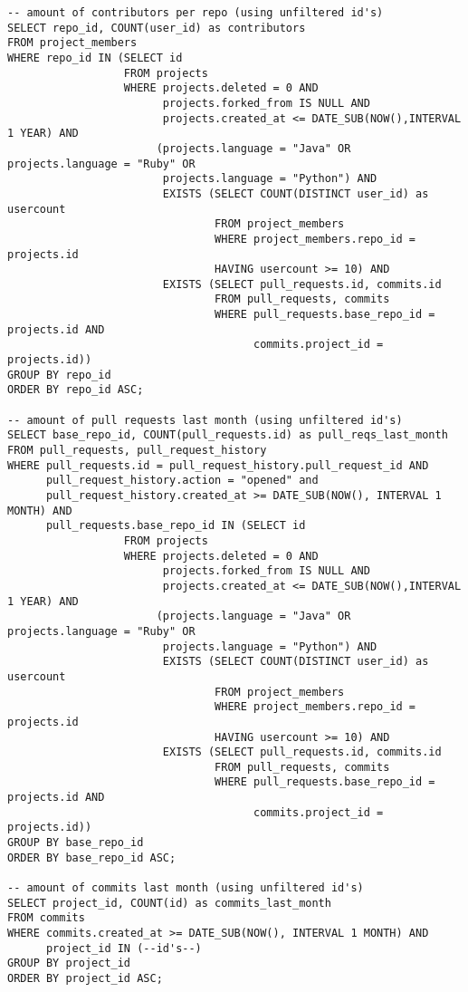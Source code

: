 \documentclass[a4paper,11pt]{article}
\begin{document}
	{\scriptsize
	\begin{verbatim}
-- amount of contributors per repo (using unfiltered id's)
SELECT repo_id, COUNT(user_id) as contributors 
FROM project_members 
WHERE repo_id IN (SELECT id  
                  FROM projects 
                  WHERE projects.deleted = 0 AND 
                        projects.forked_from IS NULL AND 
                        projects.created_at <= DATE_SUB(NOW(),INTERVAL 1 YEAR) AND 
                       (projects.language = "Java" OR projects.language = "Ruby" OR 
                        projects.language = "Python") AND 
                        EXISTS (SELECT COUNT(DISTINCT user_id) as usercount 
                                FROM project_members 
                                WHERE project_members.repo_id = projects.id  
                                HAVING usercount >= 10) AND 
                        EXISTS (SELECT pull_requests.id, commits.id 
                                FROM pull_requests, commits 
                                WHERE pull_requests.base_repo_id = projects.id AND 
                                      commits.project_id = projects.id)) 
GROUP BY repo_id 
ORDER BY repo_id ASC;

-- amount of pull requests last month (using unfiltered id's)
SELECT base_repo_id, COUNT(pull_requests.id) as pull_reqs_last_month 
FROM pull_requests, pull_request_history 
WHERE pull_requests.id = pull_request_history.pull_request_id AND 
      pull_request_history.action = "opened" and 
      pull_request_history.created_at >= DATE_SUB(NOW(), INTERVAL 1 MONTH) AND 
      pull_requests.base_repo_id IN (SELECT id 
                  FROM projects 
                  WHERE projects.deleted = 0 AND 
                        projects.forked_from IS NULL AND 
                        projects.created_at <= DATE_SUB(NOW(),INTERVAL 1 YEAR) AND 
                       (projects.language = "Java" OR projects.language = "Ruby" OR 
                        projects.language = "Python") AND 
                        EXISTS (SELECT COUNT(DISTINCT user_id) as usercount 
                                FROM project_members 
                                WHERE project_members.repo_id = projects.id 
                                HAVING usercount >= 10) AND 
                        EXISTS (SELECT pull_requests.id, commits.id 
                                FROM pull_requests, commits 
                                WHERE pull_requests.base_repo_id = projects.id AND 
                                      commits.project_id = projects.id)) 
GROUP BY base_repo_id 
ORDER BY base_repo_id ASC;

-- amount of commits last month (using unfiltered id's)
SELECT project_id, COUNT(id) as commits_last_month 
FROM commits 
WHERE commits.created_at >= DATE_SUB(NOW(), INTERVAL 1 MONTH) AND 
      project_id IN (--id's--) 
GROUP BY project_id 
ORDER BY project_id ASC;
	\end{verbatim}
	}
\end{document}
